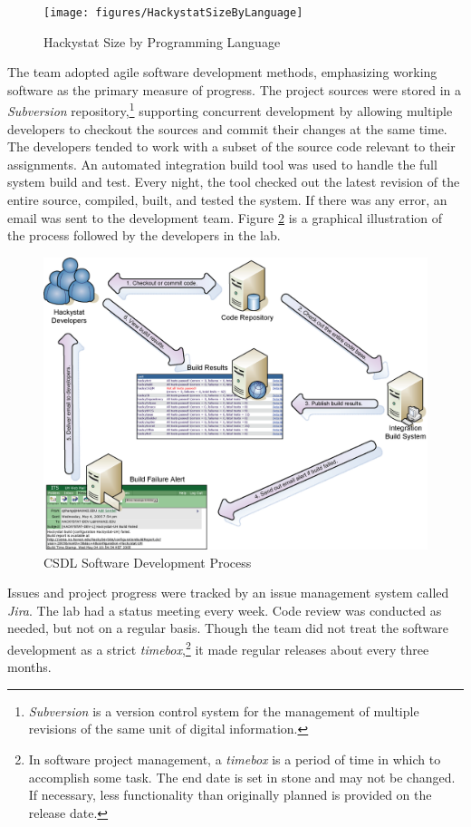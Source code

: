 \begin{figure}[tbp]
  \center
  \texttt{[image: figures/HackystatSizeByLanguage]}
  \caption{Hackystat Size by Programming Language} 
  \label{fig:HackystatSizeByLanguage}
\end{figure}

The team adopted agile software development methods, emphasizing working software as the primary measure of progress. 
The project sources were stored in a \textit{Subversion} repository,\footnote{\textit{Subversion} is a version control system for the management of multiple revisions of the same unit of digital information.} supporting concurrent development by allowing multiple developers to checkout the sources and commit their changes at the same time.
The developers tended to work with a subset of the source code relevant to their assignments. An automated integration build tool was used to handle the full system build and test. Every night, the tool checked out the latest revision of the entire source, compiled, built, and tested the system. If there was any error, an email was sent to the development team. Figure \ref{fig:BuildProcess} is a graphical illustration of the process followed by the developers in the lab.

\begin{figure}[p]
  \centering
  \includegraphics[width=1.00\textwidth]{figures/BuildProcess}
  \caption{CSDL Software Development Process}
  \label{fig:BuildProcess}
\end{figure}

Issues and project progress were tracked by an issue management system called \textit{Jira}. The lab had a status meeting every week. Code review was conducted as needed, but not on a regular basis. Though the team did not treat the software development as a strict \textit{timebox},\footnote{In software project management, a \textit{timebox} is a period of time in which to accomplish some task. The end date is set in stone and may not be changed. If necessary, less functionality than originally planned is provided on the release date.} it made regular releases about every three months.




